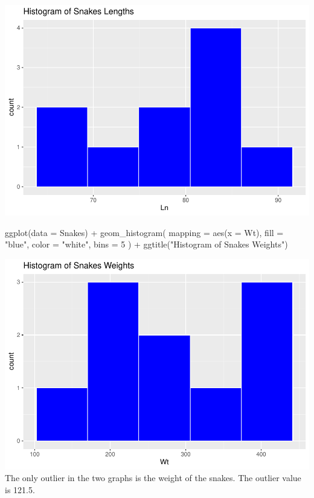 \documentclass[
]{article}
\newenvironment{Shaded}{\begin{snugshade}}{\end{snugshade}}
\newcommand{\AttributeTok}[1]{\textcolor[rgb]{0.77,0.63,0.00}{#1}}
\newcommand{\DecValTok}[1]{\textcolor[rgb]{0.00,0.00,0.81}{#1}}
\newcommand{\FunctionTok}[1]{\textcolor[rgb]{0.00,0.00,0.00}{#1}}
\newcommand{\NormalTok}[1]{#1}
\newcommand{\SpecialCharTok}[1]{\textcolor[rgb]{0.00,0.00,0.00}{#1}}
\newcommand{\StringTok}[1]{\textcolor[rgb]{0.31,0.60,0.02}{#1}}
\begin{document}
\includegraphics{Class_Exercises_ClassNotes_5_files/figure-latex/unnamed-chunk-15-1.pdf}
\newpage

\begin{Shaded}
\begin{Highlighting}[]
\FunctionTok{ggplot}\NormalTok{(}\AttributeTok{data =}\NormalTok{ Snakes) }\SpecialCharTok{+}
  \FunctionTok{geom\_histogram}\NormalTok{(}
    \AttributeTok{mapping =} \FunctionTok{aes}\NormalTok{(}\AttributeTok{x =}\NormalTok{ Wt),}
    \AttributeTok{fill =} \StringTok{"blue"}\NormalTok{,}
    \AttributeTok{color =} \StringTok{"white"}\NormalTok{,}
    \AttributeTok{bins =} \DecValTok{5}
\NormalTok{  ) }\SpecialCharTok{+}
  \FunctionTok{ggtitle}\NormalTok{(}\StringTok{"Histogram of Snakes Weights"}\NormalTok{)}
\end{Highlighting}
\end{Shaded}

\includegraphics{Class_Exercises_ClassNotes_5_files/figure-latex/unnamed-chunk-16-1.pdf}
The only outlier in the two graphs is the weight of the snakes. The
outlier value is 121.5. \newpage
\end{document}
